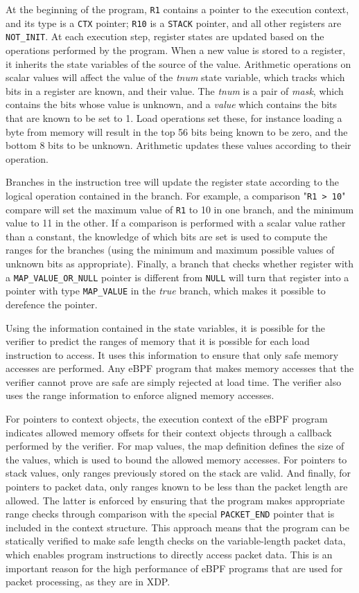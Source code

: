 \documentclass[10pt,sigconf]{acmart}
\begin{document}
At the beginning of the program, \texttt{R1} contains a pointer to the execution
context, and its type is a \texttt{CTX} pointer; \texttt{R10} is a \texttt{STACK}
pointer, and all other registers are \texttt{NOT\_INIT}. At each execution step,
register states are updated based on the operations performed by the program.
When a new value is stored to a register, it inherits the state variables of the
source of the value. Arithmetic operations on scalar values will affect the
value of the \emph{tnum} state variable, which tracks which bits in a register
are known, and their value. The \emph{tnum} is a pair of \emph{mask}, which
contains the bits whose value is unknown, and a \emph{value} which contains the
bits that are known to be set to 1. Load operations set these, for instance
loading a byte from memory will result in the top 56 bits being known to be
zero, and the bottom 8 bits to be unknown. Arithmetic updates these values
according to their operation.

Branches in the instruction tree will update the register state according to the
logical operation contained in the branch. For example, a comparison "\texttt{R1
  > 10}" compare will set the maximum value of \texttt{R1} to 10 in one branch,
and the minimum value to 11 in the other. If a comparison is performed with a
scalar value rather than a constant, the knowledge of which bits are set is used
to compute the ranges for the branches (using the minimum and maximum possible
values of unknown bits as appropriate). Finally, a branch that checks whether
register with a \texttt{MAP\_VALUE\_OR\_NULL} pointer is different from
\texttt{NULL} will turn that register into a pointer with type
\texttt{MAP\_VALUE} in the \emph{true} branch, which makes it possible to
derefence the pointer.

Using the information contained in the state variables, it is possible for the
verifier to predict the ranges of memory that it is possible for each load
instruction to access. It uses this information to ensure that only safe memory
accesses are performed. Any eBPF program that makes memory accesses that the
verifier cannot prove are safe are simply rejected at load time. The verifier
also uses the range information to enforce aligned memory accesses.

For pointers to context objects, the execution context of the eBPF program
indicates allowed memory offsets for their context objects through a callback
performed by the verifier. For map values, the map definition defines the size
of the values, which is used to bound the allowed memory accesses. For pointers
to stack values, only ranges previously stored on the stack are valid. And
finally, for pointers to packet data, only ranges known to be less than the
packet length are allowed. The latter is enforced by ensuring that the program
makes appropriate range checks through comparison with the special
\texttt{PACKET\_END} pointer that is included in the context structure. This
approach means that the program can be statically verified to make safe length
checks on the variable-length packet data, which enables program instructions to
directly access packet data. This is an important reason for the high
performance of eBPF programs that are used for packet processing, as they are in
XDP.
\end{document}
